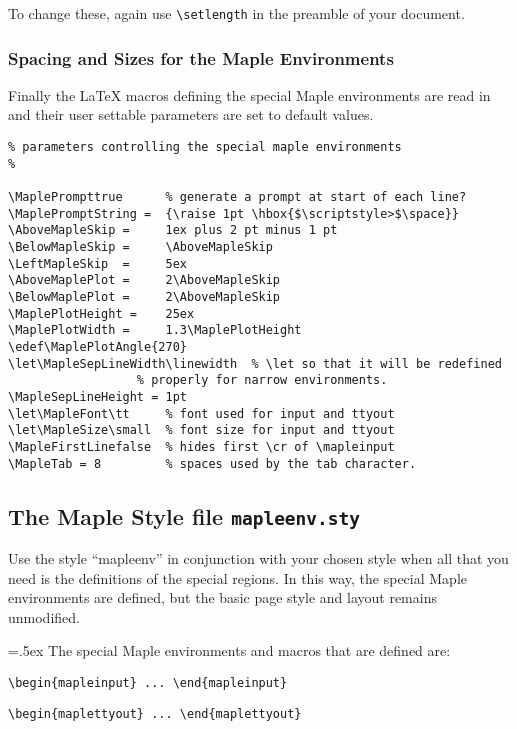 {\noindent
To change these, again use {\tt \backslash setlength} in the
preamble of your document.

\subsubsection{Spacing and Sizes for the Maple Environments}
Finally the \LaTeX{} macros defining the special Maple environments
are read in and their user settable parameters are set to
default values.

\begin{verbatim}
% parameters controlling the special maple environments
%

\MaplePrompttrue      % generate a prompt at start of each line?
\MaplePromptString =  {\raise 1pt \hbox{$\scriptstyle>$\space}}
\AboveMapleSkip =     1ex plus 2 pt minus 1 pt
\BelowMapleSkip =     \AboveMapleSkip
\LeftMapleSkip  =     5ex
\AboveMaplePlot =     2\AboveMapleSkip
\BelowMaplePlot =     2\AboveMapleSkip
\MaplePlotHeight =    25ex
\MaplePlotWidth =     1.3\MaplePlotHeight
\edef\MaplePlotAngle{270}
\let\MapleSepLineWidth\linewidth  % \let so that it will be redefined 
				  % properly for narrow environments.
\MapleSepLineHeight = 1pt
\let\MapleFont\tt     % font used for input and ttyout
\let\MapleSize\small  % font size for input and ttyout
\MapleFirstLinefalse  % hides first \cr of \mapleinput
\MapleTab = 8	      % spaces used by the tab character.
\end{verbatim}

\subsection{The Maple Style file {\tt mapleenv.sty}}
Use the style ``mapleenv'' in conjunction with
your chosen style when all that you need is the definitions
of the special regions. In this way, the special Maple environments
are defined, but the basic page style and layout remains
unmodified.

{ \parsep=.5ex
The special Maple environments and macros that are defined are:

\begin{verbatim}
\begin{mapleinput} ... \end{mapleinput}
\end{verbatim}

\begin{verbatim}
\begin{maplettyout} ... \end{maplettyout}
\end{verbatim}

}}
